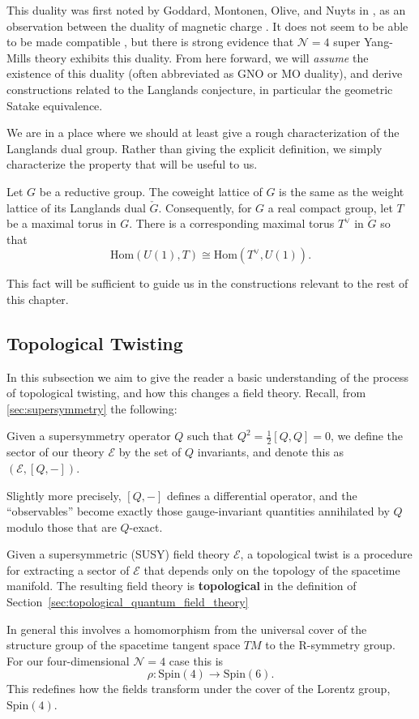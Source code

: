 	This duality was first noted by Goddard, Montonen, Olive, and Nuyts in \cite{montonen1977, goddard1977}, as an observation between the duality of magnetic charge . It does not seem to be able to be made compatible , but there is strong evidence that $\mathcal N=4$ super Yang-Mills theory exhibits this duality. From here forward, we will \emph{assume} the existence of this duality (often abbreviated as GNO or MO duality), and derive constructions related to the Langlands conjecture, in particular the geometric Satake equivalence. 
	
	We are in a place where we should at least give a rough characterization of the Langlands dual group. Rather than giving the explicit definition, we simply characterize the property that will be useful to us.
	\begin{fact}
		Let $G$ be a reductive group. The coweight lattice of $G$ is the same as the weight lattice of its Langlands dual $\check G$. Consequently, for $G$ a real compact group, let $T$ be a maximal torus in $G$. There is a corresponding maximal torus $T^\vee$ in $\check G$ so that
		\[
			\mathrm{Hom}(U(1), T) \cong \mathrm{Hom}(T^\vee, U(1)).
		\]
	\end{fact}
	This fact will be sufficient to guide us in the constructions relevant to the rest of this chapter.
	

\subsection{Topological Twisting} %
\label{sub:topological_twisting}

	In this subsection we aim to give the reader a basic understanding of the process of topological twisting, and how this changes a field theory. Recall, from \ref{sec:supersymmetry} the following:
	\begin{phys}[Sector]
		Given a supersymmetry operator $Q$ such that $Q^2 = \frac{1}{2} [Q, Q] = 0$, we define the sector of our theory $\mathcal E$ by the set of $Q$ invariants, and denote this as $(\mathcal E, [Q, -])$.
		
		Slightly more precisely, $[Q, -]$ defines a differential operator, and the ``observables'' become exactly those gauge-invariant quantities annihilated by $Q$ modulo those that are $Q$-exact.
	\end{phys}
	
	
	\begin{phys}
		Given a supersymmetric (SUSY) field theory $\mathcal E$, a topological twist is a procedure for extracting a sector of $\mathcal E$ that depends only on the topology of the spacetime manifold. The resulting field theory is \textbf{topological} in the definition of Section~\ref{sec:topological_quantum_field_theory}
	\end{phys}
	In general this involves a homomorphism from the universal cover of the structure group of the spacetime tangent space $TM$ to the R-symmetry group. For our four-dimensional $\mathcal N = 4$ case this is
	$$\rho : \mathrm{Spin}(4) \to \mathrm{Spin}(6).$$
	This redefines how the fields transform under the cover of the Lorentz group, $\mathrm{Spin}(4)$. 
	
